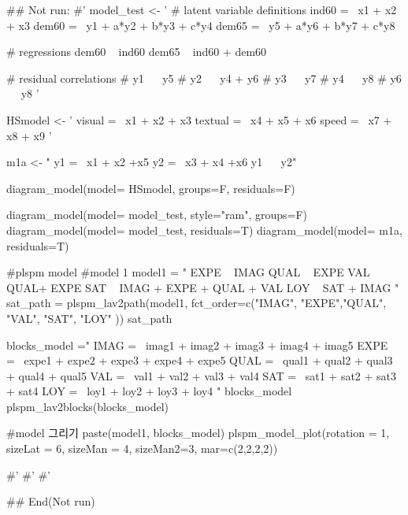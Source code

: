 \documentclass[a4paper]{book}
\begin{document}
\begin{Examples}
\begin{ExampleCode}
\#\# Not run: 
#'
model_test <- '
  # latent variable definitions
     ind60 =~ x1 + x2 + x3
     dem60 =~ y1 + a*y2 + b*y3 + c*y4
     dem65 =~ y5 + a*y6 + b*y7 + c*y8

  # regressions
    dem60 ~ ind60
    dem65 ~ ind60 + dem60

  # residual correlations
    # y1 ~~ y5
    # y2 ~~ y4 + y6
    # y3 ~~ y7
    # y4 ~~ y8
    # y6 ~~ y8
'

HSmodel <- ' visual  =~ x1 + x2 + x3
             textual =~ x4 + x5 + x6
             speed   =~ x7 + x8 + x9 '


m1a <- "
y1 =~ x1 + x2 +x5
y2 =~ x3 + x4 +x6
y1 ~~ y2"

diagram_model(model= HSmodel, groups=F,  residuals=F)

diagram_model(model= model_test, style="ram", groups=F)
diagram_model(model= model_test, residuals=T)
diagram_model(model= m1a, residuals=T)


#plspm model
#model 1
model1 = "
EXPE ~ IMAG
QUAL ~ EXPE
VAL ~  QUAL+ EXPE
SAT ~ IMAG + EXPE + QUAL + VAL
LOY ~ SAT + IMAG
"
sat_path = plspm_lav2path(model1,
                          fct_order=c("IMAG", "EXPE","QUAL", "VAL", "SAT", "LOY" ))
sat_path

blocks_model ="
IMAG =~ imag1 + imag2 + imag3 + imag4 + imag5
EXPE =~ expe1 + expe2 + expe3 + expe4 + expe5
QUAL =~ qual1 + qual2 + qual3 + qual4 + qual5
VAL =~ val1 + val2 + val3 + val4
SAT =~ sat1 + sat2 + sat3 + sat4
LOY =~ loy1 + loy2 + loy3 + loy4
"
blocks_model
plspm_lav2blocks(blocks_model)

#model 그리기
paste(model1, blocks_model)%
  plspm_model_plot(rotation = 1, sizeLat = 6, sizeMan = 4, sizeMan2=3,
                mar=c(2,2,2,2))

#'
#'
#'

## End(Not run)

\end{ExampleCode}
\end{Examples}
\end{document}
